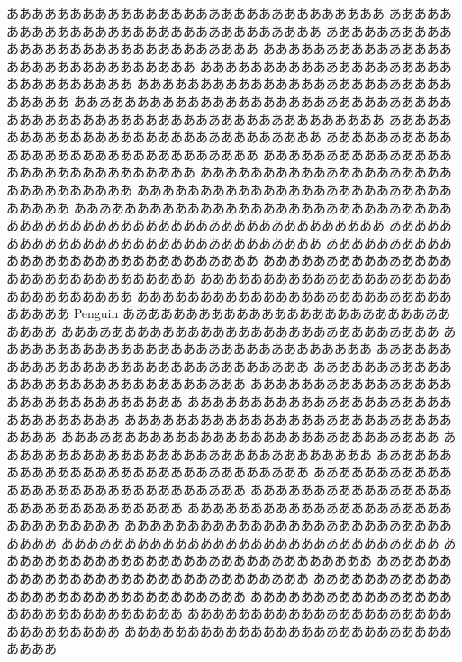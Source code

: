 ああああああああああああああああああああああああああああああ
ああああああああああああああああああああああああああああああ
ああああああああああああああああああああああああああああああ
ああああああああああああああああああああああああああああああ
ああああああああああああああああああああああああああああああ
ああああああああああああああああああああああああああああああ
ああああああああああああああああああああああああああああああ
ああああああああああああああああああああああああああああああ
ああああああああああああああああああああああああああああああ
ああああああああああああああああああああああああああああああ
%
ああああああああああああああああああああああああああああああ
ああああああああああああああああああああああああああああああ
ああああああああああああああああああああああああああああああ
ああああああああああああああああああああああああああああああ
ああああああああああああああああああああああああああああああ
ああああああああああああああああああああああああああああああ
ああああああああああああああああああああああああああああああ
ああああああああああああああああああああああああああああああ
ああああああああああああああああああああああああああああああ
ああああああああああああああああああああああああああああああ
%
Penguin
ああああああああああああああああああああああああああああああ
ああああああああああああああああああああああああああああああ
ああああああああああああああああああああああああああああああ
ああああああああああああああああああああああああああああああ
ああああああああああああああああああああああああああああああ
ああああああああああああああああああああああああああああああ
ああああああああああああああああああああああああああああああ
ああああああああああああああああああああああああああああああ
ああああああああああああああああああああああああああああああ
ああああああああああああああああああああああああああああああ
%
ああああああああああああああああああああああああああああああ
ああああああああああああああああああああああああああああああ
ああああああああああああああああああああああああああああああ
ああああああああああああああああああああああああああああああ
ああああああああああああああああああああああああああああああ
ああああああああああああああああああああああああああああああ
ああああああああああああああああああああああああああああああ
ああああああああああああああああああああああああああああああ
ああああああああああああああああああああああああああああああ
ああああああああああああああああああああああああああああああ
%
ああああああああああああああああああああああああああああああ
ああああああああああああああああああああああああああああああ
